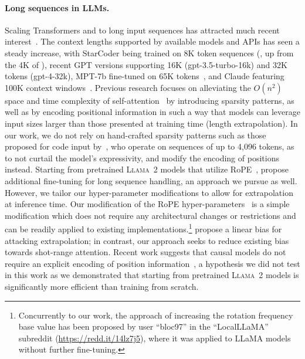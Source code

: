\documentclass[10pt]{article}
\newcommand{\llamavtwo}{\textsc{Llama~2}\xspace}
\begin{document}
\paragraph{Long sequences in LLMs.}
Scaling Transformers and \LLMs to long input sequences has attracted much recent interest~\citep{dai2019transformerxl,beltagy2020longformer,yu2023megabyte,ding2023longnet}.
The context lengths supported by available models and APIs has seen a steady increase, with StarCoder being trained on 8K token sequences (\citep{li2023starcoder}, up from the 4K of \citet{allal2023santacoder}), recent GPT versions supporting 16K (gpt-3.5-turbo-16k) and 32K tokens (gpt-4-32k), MPT-7b fine-tuned on 65K tokens~\citep{themosaicmlnlpteam2023introducing}, and Claude featuring 100K context windows~\citep{anthropic2023introducing}.
Previous research focuses on alleviating the $O(n^2)$ space and time complexity of self-attention~\citep{vaswani2017attention} by introducing sparsity patterns, as well as by encoding positional information in such a way that models can leverage input sizes larger than those presented at training time (length extrapolation).
In our work, we do not rely on hand-crafted sparsity patterns such as those proposed for code input by~\citet{guo2023longcoder}, who operate on sequences of up to 4,096 tokens, as to not curtail the model's expressivity, and modify the encoding of positions instead.
Starting from pretrained \llamavtwo models that utilize RoPE~\citep{su2021roformer}, \citet{chen2023extending} propose additional fine-tuning for long sequence handling, an approach we pursue as well.
However, we tailor our hyper-parameter modifications to allow for extrapolation at inference time.
Our modification of the RoPE hyper-parameters~\citep{su2021roformer} is a simple modification which does not require any architectural changes or restrictions and can be readily applied to existing implementations.\footnote{Concurrently to our work, the approach of increasing the rotation frequency base value has been proposed by user ``bloc97'' in the ``LocalLLaMA'' subreddit (\url{https://redd.it/14lz7j5}), where it was applied to LLaMA models without further fine-tuning.}
\citet{press2021train} propose a linear bias for attacking extrapolation; in contrast, our approach seeks to reduce existing bias towards shot-range attention.
Recent work suggests that causal models do not require an explicit encoding of position information~\citep{haviv2022transformer,kazemnejad2023impact}, a hypothesis we did not test in this work as we demonstrated that starting from pretrained \llamavtwo models is significantly more efficient than training from scratch.
 
\end{document}

